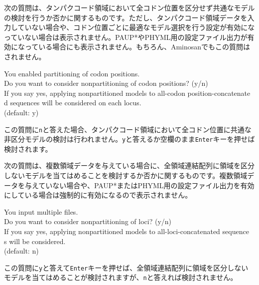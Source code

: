 \documentclass[titlepage,10pt,a4paper]{jsbook}
\newenvironment{cmd}{\begin{oframed}\raggedright\ttfamily\footnotesize\setlength{\baselineskip}{1.4em}}{\end{oframed}\vspace{-1em}}
\begin{document}
次の質問は、タンパクコード領域において全コドン位置を区分せず共通なモデルの検討を行うか否かに関するものです。ただし、タンパクコード領域データを入力していない場合や、コドン位置ごとに最適なモデル選択を行う設定が有効になっていない場合は表示されません。PAUP*やPHYML用の設定ファイル出力が有効になっている場合にも表示されません。もちろん、Aminosanでもこの質問はされません。
\begin{cmd}
You enabled partitioning of codon positions.\\
Do you want to consider nonpartitioning of codon positions? (y/n)\\
If you say yes, applying nonpartitioned models to all-codon position-concatenate\\
d sequences will be considered on each locus.\\
(default: y)
\end{cmd}
この質問に\texttt{n}と答えた場合、タンパクコード領域において全コドン位置に共通な非区分モデルの検討は行われません。\texttt{y}と答えるか空欄のまま\texttt{Enter}キーを押せば検討されます。

次の質問は、複数領域データを与えている場合に、全領域連結配列に領域を区分しないモデルを当てはめることを検討するか否かに関するものです。複数領域データを与えていない場合や、PAUP*またはPHYML用の設定ファイル出力を有効にしている場合は強制的に有効になるので表示されません。
\begin{cmd}
You input multiple files.\\
Do you want to consider nonpartitioning of loci? (y/n)\\
If you say yes, applying nonpartitioned models to all-loci-concatenated sequence\\
s will be considered.\\
(default: n)
\end{cmd}
この質問に\texttt{y}と答えて\texttt{Enter}キーを押せば、全領域連結配列に領域を区分しないモデルを当てはめることが検討されますが、\texttt{n}と答えれば検討されません。
\end{document}
